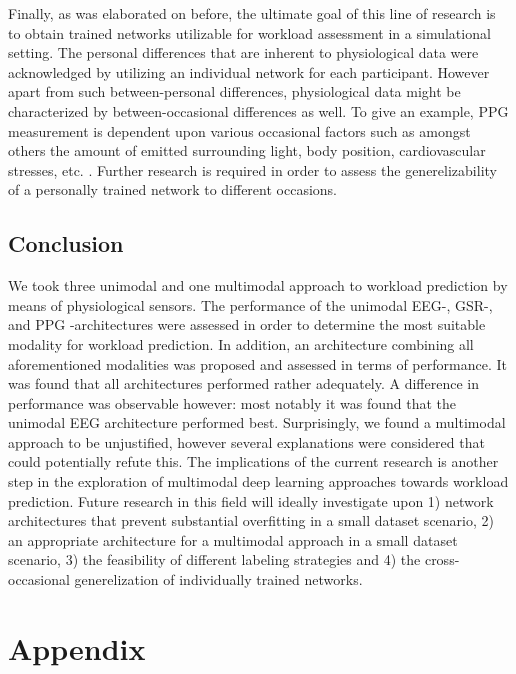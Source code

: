 \documentclass[fleqn,11pt]{paper}
\begin{document}
Finally, as was elaborated on before, the ultimate goal of this line of research is to obtain trained networks utilizable for workload assessment in a simulational setting.  The personal differences that are inherent to physiological data were acknowledged by utilizing an individual network for each participant. However apart from such between-personal differences, physiological data might be characterized by between-occasional differences as well. To give an example, PPG measurement is dependent upon various occasional factors such as amongst others the amount of emitted surrounding light, body position, cardiovascular stresses, etc. \cite{lemay2014application}. Further research is required in order to assess the generelizability of a personally trained network to different occasions.

\subsection{Conclusion}
We took three unimodal and one multimodal approach to workload prediction by means of physiological sensors. The performance of the unimodal EEG-, GSR-, and PPG -architectures were assessed in order to determine the most suitable modality for workload prediction. In addition, an architecture combining all aforementioned modalities was proposed and assessed in terms of performance. It was found that all architectures performed rather adequately. A difference in performance was observable however: most notably it was found that the unimodal EEG architecture performed best. Surprisingly, we found a multimodal approach to be unjustified, however several explanations were considered that could potentially refute this. The implications of the current research is another step in the exploration of multimodal deep learning approaches towards workload prediction. Future research in this field will ideally investigate upon 1) network architectures that prevent substantial overfitting in a small dataset scenario,  2) an appropriate architecture for a multimodal approach in a small dataset scenario, 3) the feasibility of different labeling strategies and 4) the cross-occasional generelization of individually trained networks. 

\newpage



\newpage
\appendix
\section{Appendix} \label{sec:appendix}
\end{document}
